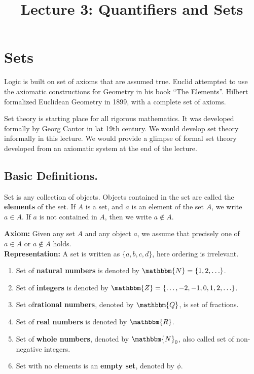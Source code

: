 \documentclass[a4paper,english,12pt]{article}
\title{ Lecture 3: Quantifiers and Sets}
\begin{document}
\maketitle

\section{Sets}
Logic is built on set of axioms that are assumed true. Euclid attempted to use the axiomatic constructions for Geometry in his book ``The Elements''. Hilbert formalized Euclidean Geometry in 1899, with a complete set of axioms. 

Set theory is starting place for all rigorous mathematics. It was developed formally by Georg Cantor in lat 19th century. We would develop set theory informally in this lecture. We would provide a glimpse of formal set theory developed from an axiomatic system at the end of the lecture. 
\subsection{Basic Definitions.}
\begin{defn}[Sets] Set is any collection of objects. Objects contained in the set are called the \textbf{elements} of the set. If ${A}$ is a set, and $a$ is an element of the set ${A}$, we write $a\in {A}$. If $a$ is not contained in ${A}$, then we write $a\notin{A}$. 
\end{defn}
\textbf{Axiom:} Given any set $A$ and any object $a$, we assume that precisely one of $a \in A$ or $a \notin A$ holds.\\
\textbf{Representation:} A set is written as $\{a,b,c,d\}$, here ordering is irrelevant. 

\begin{defn}
\begin{enumerate}
 \item Set of \textbf{natural numbers} is denoted by $\mathbbm{N} =\{1,2,\ldots\}$.
 \item Set of \textbf{integers} is denoted by $\mathbbm{Z} =\{\ldots,-2,-1,0, 1,2,\ldots\}$.
 \item Set of\textbf{rational numbers}, denoted by $\mathbbm{Q}$, is set of fractions.
 \item Set of \textbf{real numbers} is denoted by $\mathbbm{R}$.
 \item Set of \textbf{whole numbers}, denoted by $\mathbbm{N}_0$, also called set of non-negative integers.
  \item Set with no elements is an \textbf{empty set}, denoted by $\phi$.
\end{enumerate}
\end{defn}
\end{document}
